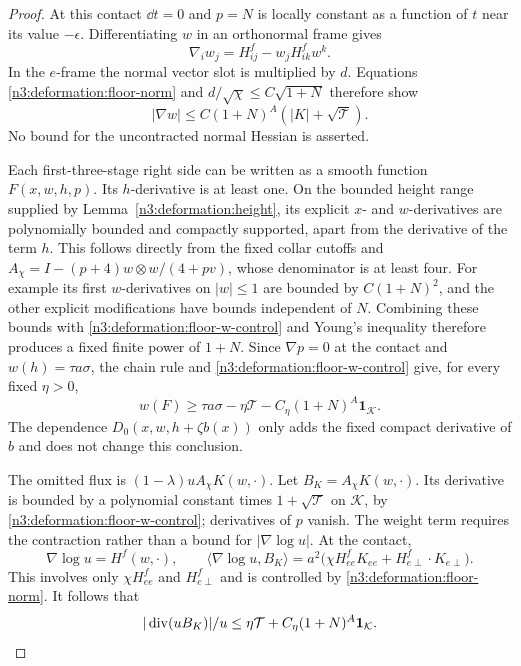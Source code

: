 \begin{proof}
At this contact $\dd t=0$ and $p=N$ is locally constant as a function
of $t$ near its value $-\epsilon$. Differentiating $w$ in an orthonormal
frame gives
\begin{equation}\label{n3:deformation:floor-w-derivative}
 \nabla_iw_j=H^f_{ij}-w_jH^f_{ik}w^k.
\end{equation}
In the $e$-frame the normal vector slot is multiplied by $d$.
Equations \eqref{n3:deformation:floor-norm} and $d/\sqrt\chi\le C\sqrt{1+N}$
therefore show
\begin{equation}\label{n3:deformation:floor-w-control}
 |\nabla w|\le C(1+N)^A(|K|+\sqrt{\mathcal T}).
\end{equation}
No bound for the uncontracted normal Hessian is asserted.

Each first-three-stage right side can be written as a smooth function
$F(x,w,h,p)$. Its $h$-derivative is at least one.
On the bounded height range supplied by Lemma~\ref{n3:deformation:height},
its explicit $x$- and $w$-derivatives are polynomially bounded and
compactly supported, apart from the derivative of the term $h$.
This follows directly from the fixed collar cutoffs and
$A_\chi=I-(p+4)w\otimes w/(4+pv)$, whose denominator is at least four.
For example its first $w$-derivatives on $|w|\le1$ are bounded by
$C(1+N)^2$, and the other explicit modifications have bounds independent
of $N$. Combining these bounds with
\eqref{n3:deformation:floor-w-control} and Young's inequality therefore
produces a fixed finite power of $1+N$.
Since $\nabla p=0$ at the contact and $w(h)=\tau a\sigma$, the chain rule
and \eqref{n3:deformation:floor-w-control} give, for every fixed $\eta>0$,
\begin{equation}\label{n3:deformation:floor-F-control}
 w(F)\ge\tau a\sigma-\eta\mathcal T
                 -C_\eta(1+N)^A\mathbf1_{\mathcal K}.
\end{equation}
The dependence $D_0(x,w,h+\zeta b(x))$ only adds the fixed compact
derivative of $b$ and does not change this conclusion.

The omitted flux is $(1-\lambda)uA_\chi K(w,\cdot)$.
Let $B_K=A_\chi K(w,\cdot)$. Its derivative is bounded by a polynomial
constant times $1+\sqrt{\mathcal T}$ on $\mathcal K$, by
\eqref{n3:deformation:floor-w-control}; derivatives of $p$ vanish.
The weight term requires the contraction rather than a bound for
$|\nabla\log u|$. At the contact,
\[
 \nabla\log u=H^f(w,\cdot),\qquad
 \langle\nabla\log u,B_K\rangle
 =a^2\bigl(\chi H^f_{ee}K_{ee}
                    +H^f_{e\perp}\cdot K_{e\perp}\bigr).
\]
This involves only $\chi H^f_{ee}$ and $H^f_{e\perp}$ and is controlled
by \eqref{n3:deformation:floor-norm}. It follows that
\begin{equation}\label{n3:deformation:floor-flux-control}
 |\operatorname{div}(uB_K)|/u
 \le\eta\mathcal T+C_\eta(1+N)^A\mathbf1_{\mathcal K}.
\end{equation}


\end{proof}
